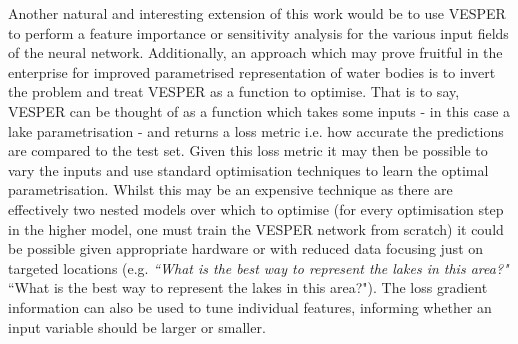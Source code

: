 \documentclass[hess, twostagejnl]{copernicus}
\providecommand{\DIFadd}[1]{{\protect\color{blue} \sf #1}} %
\providecommand{\DIFdel}[1]{{\protect\color{red} \scriptsize #1}} %
\providecommand{\DIFaddbegin}{} %
\providecommand{\DIFaddend}{} %
\providecommand{\DIFdelbegin}{} %
\providecommand{\DIFdelend}{} %
\begin{document}
\DIFaddbegin \newline 




\DIFadd{Another natural and interesting }\DIFaddend extension of this work \DIFaddbegin \DIFadd{would be to use VESPER to perform a feature importance or sensitivity analysis for the various input fields of the neural network. Additionally, an approach }\DIFaddend which may prove fruitful in the enterprise for improved parametrised representation of water bodies is to invert the problem and treat VESPER as a function to optimise. That is to say, VESPER can be thought of as a function which takes some inputs - in this case a lake parametrisation - and returns a loss metric i.e. how accurate the predictions are compared to the test set. Given this loss metric it may then be possible to vary the inputs and use standard optimisation techniques to learn the optimal parametrisation. Whilst this may be an expensive technique as there are effectively two nested models over which to optimise (for every optimisation step in the higher model, one must train the VESPER network from scratch) it could be possible given appropriate hardware or with reduced data focusing just on targeted locations (e.g. \DIFdelbegin \DIFdel{\textit{``What is the best way to represent the lakes in this area?"}}\DIFdelend \DIFaddbegin \DIFadd{“What is the best way to represent the lakes in this area?"}\DIFaddend ). The loss gradient information can also be used to tune individual features, informing whether an input variable should be larger or smaller.
\end{document}
